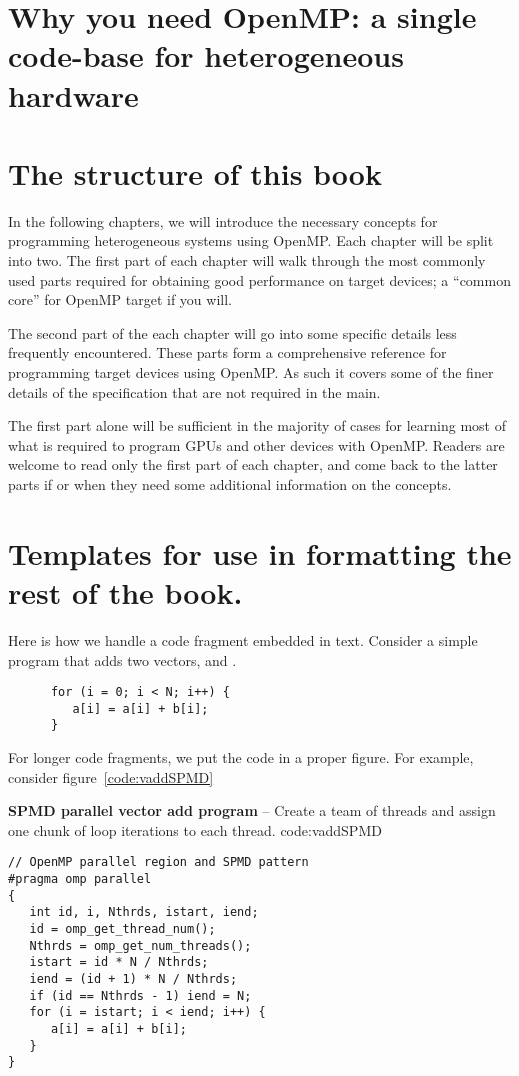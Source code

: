 \section{Why you need OpenMP: a single code-base for heterogeneous hardware}

\section{The structure of this book}
In the following chapters, we will introduce the necessary concepts for programming heterogeneous systems using OpenMP.
Each chapter will be split into two.
The first part of each chapter will walk through the most commonly used parts required for obtaining good performance on target devices; a ``common core'' for OpenMP target if you will.

The second part of the each chapter will go into some specific details less frequently encountered.
These parts form a comprehensive reference for programming target devices using OpenMP.
As such it covers some of the finer details of the specification that are not required in the main.

The first part alone will be sufficient in the majority of cases for learning most of what is required to program GPUs and other devices with OpenMP.
Readers are welcome to read only the first part of each chapter, and come back to the latter parts if or when they need some additional information on the concepts.


\section{Templates for use in formatting the rest of the book.}

Here is how we handle a code fragment embedded in text.
Consider a simple program that adds two vectors,  and .
\begin{verbatim}
      for (i = 0; i < N; i++) { 
         a[i] = a[i] + b[i];
      }
\end{verbatim}  

For longer code fragments, we put the code in a proper figure.  For example, consider figure~\ref{code:vaddSPMD}

\begin{CodeExample}%
{\textbf{SPMD parallel vector add program} -- \small
Create a team of threads and assign one chunk of loop iterations
to each thread.
}%
{code:vaddSPMD}
\begin{lstlisting}
// OpenMP parallel region and SPMD pattern
#pragma omp parallel
{
   int id, i, Nthrds, istart, iend;
   id = omp_get_thread_num();
   Nthrds = omp_get_num_threads(); 
   istart = id * N / Nthrds;
   iend = (id + 1) * N / Nthrds;
   if (id == Nthrds - 1) iend = N; 
   for (i = istart; i < iend; i++) {
      a[i] = a[i] + b[i];
   }
}
\end{lstlisting}
\end{CodeExample} 




